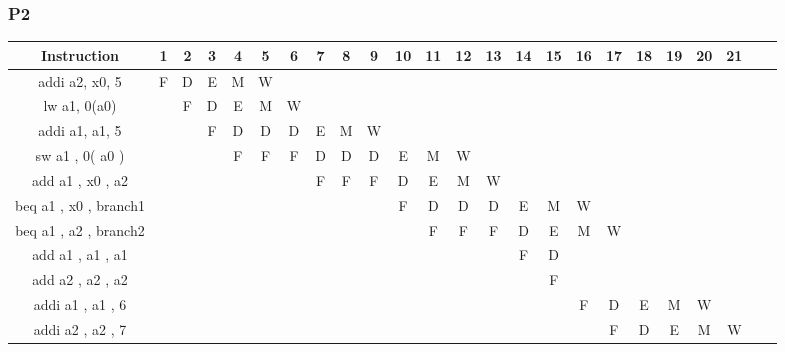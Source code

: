 \subsubsection*{P2}
\begin{center}
    \tiny
    \begin{tabular}{c | c | c | c | c | c | c | c | c | c | c | c | c | c | c | c | c | c | c | c | c | c | c | c}
        \textbf{Instruction} & \textbf{1} & \textbf{2} & \textbf{3} & \textbf{4} & \textbf{5} & \textbf{6} & \textbf{7} & \textbf{8} & \textbf{9} & \textbf{10} & \textbf{11} & \textbf{12} & \textbf{13} & \textbf{14} & \textbf{15} & \textbf{16} & \textbf{17} & \textbf{18} & \textbf{19} & \textbf{20} & \textbf{21}  \\
        \hline
        addi a2, x0, 5           & F & D & E & M & W &   &   &   &   &   &   &   &   &   &   &   &   &   &   &   &  \\
        lw a1, 0(a0)             &   & F & D & E & M & W &   &   &   &   &   &   &   &   &   &   &   &   &   &   &  \\
        addi a1, a1, 5           &   &   & F & D & D & D & E & M & W &   &   &   &   &   &   &   &   &   &   &   &  \\
        sw a1 , 0( a0 )          &   &   &   & F & F & F & D & D & D & E & M & W &   &   &   &   &   &   &   &   &  \\
        add a1 , x0 , a2         &   &   &   &   &   &   & F & F & F & D & E & M & W &   &   &   &   &   &   &   &  \\
        beq a1 , x0 , branch1    &   &   &   &   &   &   &   &   &   & F & D & D & D & E & M & W &   &   &   &   &  \\
        beq a1 , a2 , branch2    &   &   &   &   &   &   &   &   &   &   & F & F & F & D & E & M & W &   &   &   &  \\
        add a1 , a1 , a1         &   &   &   &   &   &   &   &   &   &   &   &   &   & F & D &   &   &   &   &   &  \\
        add a2 , a2 , a2         &   &   &   &   &   &   &   &   &   &   &   &   &   &   & F &   &   &   &   &   &  \\
        addi a1 , a1 , 6         &   &   &   &   &   &   &   &   &   &   &   &   &   &   &   & F & D & E & M & W &  \\
        addi a2 , a2 , 7         &   &   &   &   &   &   &   &   &   &   &   &   &   &   &   &   & F & D & E & M & W \\
    \end{tabular}
\end{center}

